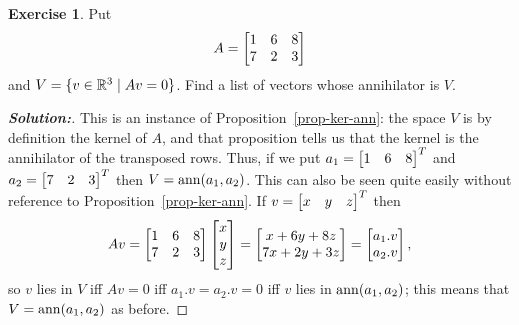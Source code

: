 \documentclass[a4paper]{amsart}
\theoremstyle{definition}
\newtheorem{exercise}{Exercise}
\newenvironment{solution}{\begin{proof}[\textbf{Solution:}] \vphantom{u}}{\end{proof}}
\begin{document}
\begin{exercise}\label{ex-ann-eqs-i}
 Put 
 \[ A = \left[\begin{matrix} 1 & 6 & 8 \\ 7 & 2 & 3 \end{matrix}\right] \]
 and $V=\{v\in{\mathbb{R}}^3\;|\; Av=0\}$.  Find a list of vectors whose
 annihilator is $V$.
\end{exercise}
\begin{solution}
 This is an instance of Proposition~\ref{prop-ker-ann}: the space $V$
 is by definition the kernel of $A$, and that proposition tells us
 that the kernel is the annihilator of the transposed rows.  Thus, if
 we put $a_1=\left[\begin{matrix} 1&6&8\end{matrix}\right]^T$ and $a_2=\left[\begin{matrix} 7&2&3\end{matrix}\right]^T$ then 
 $V=\operatorname{ann}(a_1,a_2)$.  This can also be seen quite easily without
 reference to Proposition~\ref{prop-ker-ann}.  If $v=\left[\begin{matrix} x&y&z\end{matrix}\right]^T$
 then 
 \[ Av = \left[\begin{matrix} 1 & 6 & 8 \\ 7 & 2 & 3 \end{matrix}\right] \left[\begin{matrix} x \\ y \\ z \end{matrix}\right] =
    \left[\begin{matrix} x+6y+8z \\ 7x+2y+3z \end{matrix}\right] = 
    \left[\begin{matrix} a_1.v \\ a_2.v \end{matrix}\right],
 \]
 so $v$ lies in $V$ iff $Av=0$ iff $a_1.v=a_2.v=0$ iff $v$ lies in
 $\operatorname{ann}(a_1,a_2)$; this means that $V=\operatorname{ann}(a_1,a_2)$ as before.
\end{solution}
\end{document}
